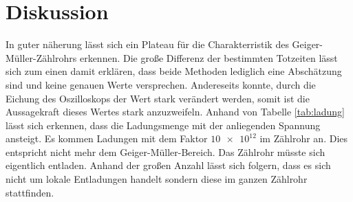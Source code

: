 \section{Diskussion}
\label{sec:Diskussion}
In guter näherung lässt sich ein Plateau für die Charakterristik des Geiger-Müller-Zählrohrs erkennen.
Die große Differenz der bestimmten Totzeiten lässt sich zum einen damit erklären, dass beide Methoden lediglich eine Abschätzung sind und keine genauen Werte versprechen.
Andereseits konnte, durch die Eichung des Oszilloskops der Wert stark verändert werden, somit ist die Aussagekraft dieses Wertes stark anzuzweifeln.
Anhand von Tabelle \ref{tab:ladung} lässt sich erkennen, dass die Ladungsmenge mit der anliegenden Spannung ansteigt.
Es kommen Ladungen mit dem Faktor $\num{10e12}$ im Zählrohr an.
Dies entspricht nicht mehr dem Geiger-Müller-Bereich.
Das Zählrohr müsste sich eigentlich entladen.
Anhand der großen Anzahl lässt sich folgern, dass es sich nicht um lokale Entladungen handelt sondern diese im ganzen Zählrohr stattfinden.
